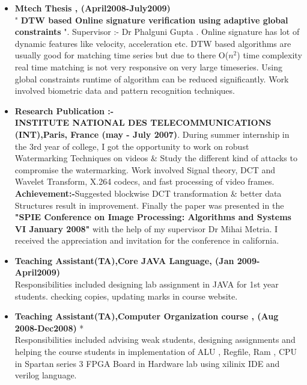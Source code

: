 \documentclass[]{res}
\makeatletter
\newcommand{\ressubheading}[4]{
\begin{tabular*}{6.5in}{l@{\extracolsep{\fill}}r}
		\textbf{#1} & #2 \\
		\textit{#3} & \textit{#4} \\
\end{tabular*}\vspace{-6pt}}
\makeatother
\begin{document}
\begin{description}
\vspace{0.2in}




\item[]
\begin{itemize}
\item {\textbf{Mtech Thesis     ,                                                                        (April2008-July2009) }\\
	" \textbf{DTW based Online signature verification using adaptive global constraints} ".  Supervisor :- Dr Phalguni Gupta .
Online signature has lot of dynamic features like velocity, acceleration etc. DTW based algorithms are usually good for matching time series but due to there O($n^2$) time complexity real time matching is not very responsive on very large timeseries. Using global constraints runtime of algorithm can be reduced significantly. Work involved biometric data and pattern recognition techniques.}
\end{itemize}


\item[]
\begin{itemize}
	\item \textbf {Research Publication :-}\\
	 \textbf{INSTITUTE NATIONAL DES TELECOMMUNICATIONS (INT),Paris, France  (may - July 2007)}.  
	During summer internship in the 3rd year of college, I got the opportunity to work on robust Watermarking  Techniques on videos \& Study the different kind of attacks to compromise the watermarking. Work involved Signal theory, DCT and Wavelet Transform, X.264 codecs, and fast processing of video frames. \textbf{Achievement:-}Suggested blockwise DCT transformation \&  better data Structures result in improvement. Finally the paper was presented in the \textbf{"SPIE Conference on Image Processing: Algorithms and Systems VI January 2008"}  with the help of my supervisor Dr Mihai Metria. I received the appreciation and invitation for the conference in california. 
\end{itemize}

\item[]
\begin{itemize}
	\item  \textbf{Teaching Assistant(TA),Core JAVA Language, (Jan 2009-April2009)}\\
	Responsibilities included designing lab assignment in JAVA for 1st year students. checking copies, updating marks in course website.
\end{itemize}

\item[]
\begin{itemize}
	\item \textbf{ Teaching Assistant(TA),Computer Organization course , (Aug 2008-Dec2008)} *\\
	Responsibilities included advising weak students, designing assignments  and  helping the course students in implementation of ALU , Regfile, Ram , CPU in Spartan series 3 FPGA Board in Hardware lab using xilinix IDE and verilog language.
\end{itemize}

\end{description}
\end{document}
